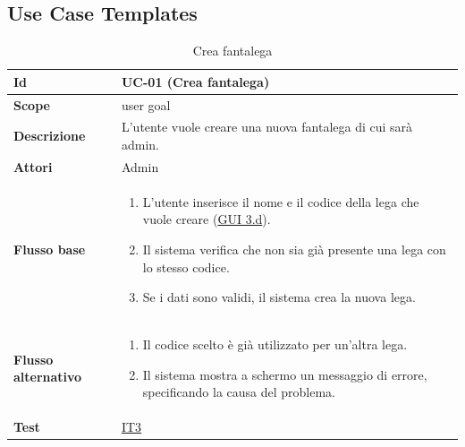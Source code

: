 
\subsection{Use Case Templates}

\begin{table}[H]
\caption{Crea fantalega}
\label{UC-01}

\begin{tabularx}{\textwidth}{|l|X|}
\hline
\textbf{Id} & UC-01 (Crea fantalega) \\
\hline
\textbf{Scope} & user goal \\
\hline
\textbf{Descrizione} & L'utente vuole creare una nuova fantalega di cui sarà admin. \\
\hline
\textbf{Attori} & Admin \\
\hline
\textbf{Flusso base} &
\begin{enumerate}[leftmargin=*]
    \item L'utente inserisce il nome e il codice della lega che vuole creare (\hyperref[fig:mockup_parte3]{GUI 3.d}).
    \item Il sistema verifica che non sia già presente una lega con lo stesso codice.
    \item Se i dati sono validi, il sistema crea la nuova lega.
\end{enumerate} \\
\hline
\textbf{Flusso alternativo} &
\begin{enumerate}[leftmargin=*,label=2.\arabic*]
    \item Il codice scelto è già utilizzato per un'altra lega.
    \item Il sistema mostra a schermo un messaggio di errore, specificando la causa del problema.
\end{enumerate} \\
\hline
\textbf{Test} & \hyperref[IT3]{IT3} \\
\hline
\end{tabularx}

\end{table}



